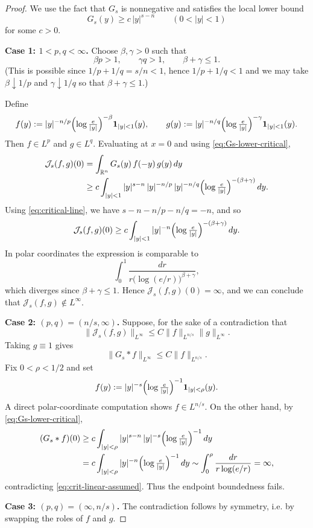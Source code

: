 \documentclass[12pt]{article}
\theoremstyle{definition}
\theoremstyle{remark}
\numberwithin{equation}{section}
\begin{document}
\begin{proof}
We use the fact that $G_s$ is nonnegative and satisfies the local lower bound
\begin{equation}\label{eq:Gs-lower-critical}
G_s(y)\ge c\,|y|^{s-n}\qquad(0<|y|<1)
\end{equation}
for some $c>0$.

\medskip
\noindent\textbf{Case 1: $1<p,q<\infty$.}
Choose $\beta,\gamma>0$ such that
\[
\beta p>1,\qquad \gamma q>1,\qquad \beta+\gamma\le 1.
\]
(This is possible since $1/p+1/q=s/n<1$, hence $1/p+1/q<1$ and we may take
$\beta\downarrow 1/p$ and $\gamma\downarrow 1/q$ so that $\beta+\gamma\le 1$.)

Define
\[
f(y):=|y|^{-n/p}\Bigl(\log\tfrac{e}{|y|}\Bigr)^{-\beta}\mathbf 1_{|y|<1}(y),
\qquad
g(y):=|y|^{-n/q}\Bigl(\log\tfrac{e}{|y|}\Bigr)^{-\gamma}\mathbf 1_{|y|<1}(y).
\]
Then $f\in L^p$ and $g\in L^q$. Evaluating at $x=0$ and using
\eqref{eq:Gs-lower-critical},
\begin{align*}
\mathcal{J}_s(f,g)(0)
&=\int_{\mathbb R^n} G_s(y)\,f(-y)\,g(y)\,dy \\
&\ge c\int_{|y|<1}
|y|^{s-n}\,|y|^{-n/p}\,|y|^{-n/q}
\Bigl(\log\tfrac{e}{|y|}\Bigr)^{-(\beta+\gamma)}\,dy.
\end{align*}
Using \eqref{eq:critical-line}, we have
$s-n-n/p-n/q=-n$, and so
\[
\mathcal{J}_s(f,g)(0)\ge c\int_{|y|<1}
|y|^{-n}\Bigl(\log\tfrac{e}{|y|}\Bigr)^{-(\beta+\gamma)}\,dy.
\]
In polar coordinates the expression is comparable to
\[
\int_0^1 \frac{dr}{r\bigl(\log(e/r)\bigr)^{\beta+\gamma}},
\]
which diverges since $\beta+\gamma\le 1$. Hence $\mathcal{J}_s(f,g)(0)=\infty$,
and we can conclude that $\mathcal{J}_s(f,g)\notin L^\infty$.

\medskip
\noindent\textbf{Case 2: $(p,q)=(n/s,\infty)$.}
Suppose, for the sake of a contradiction that
\[
\|\mathcal{J}_s(f,g)\|_{L^\infty}\le C\|f\|_{L^{n/s}}\|g\|_{L^\infty}.
\]
Taking $g\equiv 1$ gives
\begin{equation}\label{eq:crit-linear-assumed}
\|G_s*f\|_{L^\infty}\le C\|f\|_{L^{n/s}}.
\end{equation}
Fix $0<\rho<1/2$ and set
\[
f(y):=|y|^{-s}\Bigl(\log\tfrac{e}{|y|}\Bigr)^{-1}\mathbf 1_{|y|<\rho}(y).
\]
A direct polar-coordinate computation shows $f\in L^{n/s}$. On the other hand,
by \eqref{eq:Gs-lower-critical},
\begin{align*}
(G_s*f)(0)
&\ge c\int_{|y|<\rho} |y|^{s-n}\,|y|^{-s}\Bigl(\log\tfrac{e}{|y|}\Bigr)^{-1}\,dy \\
&= c\int_{|y|<\rho} |y|^{-n}\Bigl(\log\tfrac{e}{|y|}\Bigr)^{-1}\,dy
\sim \int_0^\rho \frac{dr}{r\log(e/r)}=\infty,
\end{align*}
contradicting \eqref{eq:crit-linear-assumed}. Thus the endpoint boundedness fails.

\medskip
\noindent\textbf{Case 3: $(p,q)=(\infty,n/s)$.}
The contradiction follows by symmetry, i.e. by swapping the roles of $f$ and $g$.\end{proof}
\end{document}
